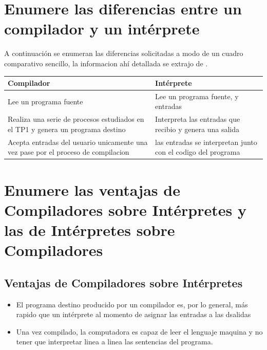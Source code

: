 \documentclass{article}
\begin{document}
\section{Enumere las diferencias entre un compilador y un int\'erprete}
A continuaci\'on se enumeran las diferencias solicitadas a modo de un cuadro comparativo sencillo, la informacion ah\'i detallada se extrajo de \cite{comppth}.

\begin{center}
	\begin{tabular}{||  p{55mm} p{55mm}  ||} 
		\hline
		\textbf{Compilador} & \textbf{Int\'erprete} \\ [0.5ex] 
		\hline\hline
		Lee un programa fuente  & Lee un programa fuente, y entradas \\ \hline
		Realiza una serie de procesos estudiados en el TP1 y genera un programa destino & Interpreta las entradas que recibio y genera una salida \\
		\hline
		Acepta entradas del usuario unicamente una vez pase por el proceso de compilacion & las entradas se interpretan junto con el codigo del programa \\
		\hline
	\end{tabular}
\end{center}


\section{Enumere las ventajas de Compiladores sobre Int\'erpretes y las de Int\'erpretes sobre Compiladores}

\subsection{Ventajas de Compiladores sobre Int\'erpretes} \cite{comppth} \cite{comintp}
\begin{itemize}
\item El programa destino producido por un compilador es, por lo general, m\'as rapido que un int\'erprete al momento de asignar las entradas a las dsalidas
\item Una vez compilado, la computadora es capaz de leer el lenguaje maquina y no tener que interpretar linea a linea las sentencias del programa. 
\end{itemize}
\end{document}
